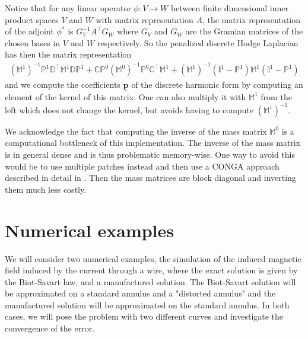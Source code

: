 \documentclass[../master_thesis.tex]{subfiles}
\begin{document}
Notice that for any linear operator $\phi:V \rightarrow W$ between finite dimensional inner product spaces 
$V$ and $W$ with matrix representation $A$, the matrix representation of the
adjoint $\phi^*$ is $G_V^{-1} A^\top G_W$ where 
$G_V$ and $G_W$ are the Gramian matrices of the chosen bases in $V$ and $W$ 
respectively. So the penalized discrete Hodge Laplacian has then the matrix 
representation \begin{align*}
    (\mathbb{M}^1)^{-1} \mathbb{P}^1\mathbb{D}^\top \mathbb{M}^1 \mathbb{D}\mathbb{P}^1 
    + \mathbb{C} \mathbb{P}^0 (\mathbb{M}^0)^{-1} \mathbb{P}^0 \mathbb{C}^\top \mathbb{M}^1
    + (\mathbb{M}^1)^{-1} (\mathbb{I}^1-\mathbb{P}^1) \mathbb{M}^1 (\mathbb{I}^1 - \mathbb{P}^1)
\end{align*} and we compute the 
coefficients $\underline{\mathbf{p}}$ of the discrete harmonic form
by computing an element of the kernel of this matrix. One can also multiply it with 
$\mathbb{M}^1$ from the left which does not change the kernel, but avoids having to 
compute $(\mathbb{M}^1)^{-1}$. 
\begin{remark}
    We acknowledge the fact that computing the inverse of the mass matrix $\mathbb{M}^0$
    is a computational bottleneck of this implementation. The inverse of the mass matrix 
    is in general dense and is thus
    problematic memory-wise. 
    One way to avoid this would be to use multiple patches instead and then use a 
    CONGA approach described in detail in \cite{multipatch_paper}. Then the mass matrices 
    are block diagonal and inverting them much less costly.
\end{remark}


\section{Numerical examples}\label{sec:numerical_examples}
We will consider two numerical examples, the simulation of the induced magnetic 
field induced by the current through a wire, where the exact solution is given by the Biot-Savart law, and 
a manufactured solution. The Biot-Savart solution will be approximated on a standard annulus 
and a "distorted annulus" and the manufactured solution will be approximated 
on the standard annulus. In both cases, we will pose the problem with two different curves 
and investigate the convergence of the error.
\end{document}
